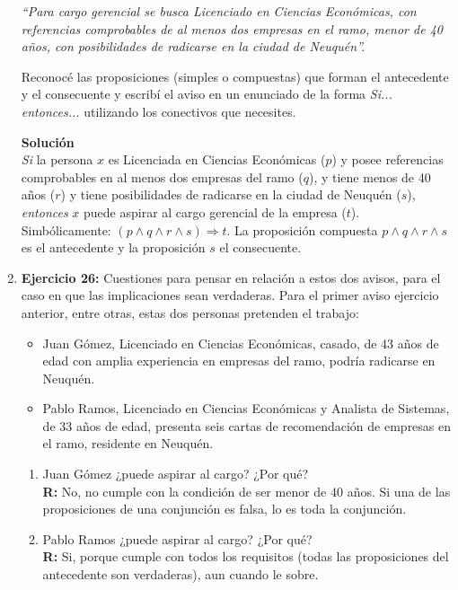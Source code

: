 \documentclass[12pt]{article}
\theoremstyle{definition}
\theoremstyle{remark}
\begin{document}
\begin{enumerate}
\textit{ “Para cargo gerencial se busca Licenciado en Ciencias Económicas, con referencias comprobables de al menos dos empresas en el ramo, menor de 40 años, con posibilidades de radicarse en la ciudad de Neuquén”.}

Reconocé las proposiciones (simples o compuestas) que forman el antecedente y el consecuente y escribí el aviso en un enunciado de la forma \textit{Si... entonces...} utilizando los conectivos que necesites.

\noindent
\textbf{Solución}\\ 
\textit{Si} la persona $x$ es Licenciada en Ciencias Económicas ($p$) y posee referencias comprobables en al menos dos empresas del ramo ($q$), y tiene menos de 40 años ($r$) y tiene posibilidades de radicarse en la ciudad de Neuquén ($s$), \textit{entonces} $x$ puede aspirar al cargo gerencial de la empresa ($t$). Simbólicamente: $(p \wedge q \wedge r \wedge s) \Rightarrow t$. La proposición compuesta $p \wedge q \wedge r \wedge s$ es el antecedente y la proposición $s$ el consecuente.


\item \textbf{Ejercicio 26: } Cuestiones para pensar en relación a estos dos avisos, para el caso en que las implicaciones sean verdaderas. Para el primer aviso ejercicio anterior, entre otras, estas dos personas pretenden el trabajo:
\begin{itemize}
\item Juan Gómez, Licenciado en Ciencias Económicas, casado, de 43 años de edad con amplia experiencia en empresas del ramo, podría radicarse en Neuquén.
\item Pablo Ramos, Licenciado en Ciencias Económicas y Analista de Sistemas, de 33 años de edad, presenta seis cartas de recomendación de empresas en el ramo, residente en Neuquén. 
\end{itemize}

\begin{enumerate}
\item Juan Gómez ¿puede aspirar al cargo? ¿Por qué?\\
\textbf{R:} No, no cumple con la condición de ser menor de 40 años. Si una de las proposiciones de una conjunción es falsa, lo es toda la conjunción. 

\item Pablo Ramos ¿puede aspirar al cargo? ¿Por qué?\\
\textbf{R:} Si, porque cumple con todos los requisitos (todas las proposiciones del antecedente son verdaderas), aun cuando le sobre.


\end{enumerate}
\end{enumerate}
\end{document}
